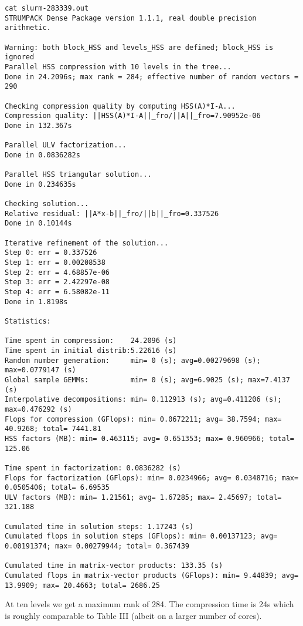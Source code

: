 \documentclass{acmsmall}
\begin{document}
\begin{verbatim}
cat slurm-283339.out
STRUMPACK Dense Package version 1.1.1, real double precision arithmetic.

Warning: both block_HSS and levels_HSS are defined; block_HSS is ignored
Parallel HSS compression with 10 levels in the tree...
Done in 24.2096s; max rank = 284; effective number of random vectors = 290

Checking compression quality by computing HSS(A)*I-A...
Compression quality: ||HSS(A)*I-A||_fro/||A||_fro=7.90952e-06
Done in 132.367s

Parallel ULV factorization...
Done in 0.0836282s

Parallel HSS triangular solution...
Done in 0.234635s

Checking solution...
Relative residual: ||A*x-b||_fro/||b||_fro=0.337526
Done in 0.10144s

Iterative refinement of the solution...
Step 0: err = 0.337526
Step 1: err = 0.00208538
Step 2: err = 4.68857e-06
Step 3: err = 2.42297e-08
Step 4: err = 6.58082e-11
Done in 1.8198s

Statistics: 

Time spent in compression:    24.2096 (s)
Time spent in initial distrib:5.22616 (s)
Random number generation:     min= 0 (s); avg=0.00279698 (s); max=0.0779147 (s)
Global sample GEMMs:          min= 0 (s); avg=6.9025 (s); max=7.4137 (s)
Interpolative decompositions: min= 0.112913 (s); avg=0.411206 (s); max=0.476292 (s)
Flops for compression (GFlops): min= 0.0672211; avg= 38.7594; max= 40.9268; total= 7441.81
HSS factors (MB): min= 0.463115; avg= 0.651353; max= 0.960966; total= 125.06

Time spent in factorization: 0.0836282 (s)
Flops for factorization (GFlops): min= 0.0234966; avg= 0.0348716; max= 0.0505406; total= 6.69535
ULV factors (MB): min= 1.21561; avg= 1.67285; max= 2.45697; total= 321.188

Cumulated time in solution steps: 1.17243 (s)
Cumulated flops in solution steps (GFlops): min= 0.00137123; avg= 0.00191374; max= 0.00279944; total= 0.367439

Cumulated time in matrix-vector products: 133.35 (s)
Cumulated flops in matrix-vector products (GFlops): min= 9.44839; avg= 13.9909; max= 20.4663; total= 2686.25
\end{verbatim}
At ten levels we get a maximum rank of 284.  The compression time
is 24s which is roughly comparable to Table III (albeit on a
larger number of cores).
\end{document}
